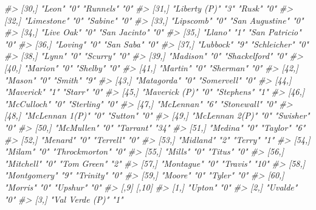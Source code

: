 \documentclass[
  12pt,
  openany]{book}
\newenvironment{Shaded}{\begin{snugshade}}{\end{snugshade}}
\newcommand{\CommentTok}[1]{\textcolor[rgb]{0.37,0.37,0.37}{\textit{#1}}}
\begin{document}
\begin{Shaded}
\begin{Highlighting}[]
\CommentTok{\#\textgreater{} [30,] "Leon"          "0"  "Runnels"       "0" }
\CommentTok{\#\textgreater{} [31,] "Liberty (P)"   "3"  "Rusk"          "0" }
\CommentTok{\#\textgreater{} [32,] "Limestone"     "0"  "Sabine"        "0" }
\CommentTok{\#\textgreater{} [33,] "Lipscomb"      "0"  "San Augustine" "0" }
\CommentTok{\#\textgreater{} [34,] "Live Oak"      "0"  "San Jacinto"   "0" }
\CommentTok{\#\textgreater{} [35,] "Llano"         "1"  "San Patricio"  "0" }
\CommentTok{\#\textgreater{} [36,] "Loving"        "0"  "San Saba"      "0" }
\CommentTok{\#\textgreater{} [37,] "Lubbock"       "9"  "Schleicher"    "0" }
\CommentTok{\#\textgreater{} [38,] "Lynn"          "0"  "Scurry"        "0" }
\CommentTok{\#\textgreater{} [39,] "Madison"       "0"  "Shackelford"   "0" }
\CommentTok{\#\textgreater{} [40,] "Marion"        "0"  "Shelby"        "0" }
\CommentTok{\#\textgreater{} [41,] "Martin"        "0"  "Sherman"       "0" }
\CommentTok{\#\textgreater{} [42,] "Mason"         "0"  "Smith"         "9" }
\CommentTok{\#\textgreater{} [43,] "Matagorda"     "0"  "Somervell"     "0" }
\CommentTok{\#\textgreater{} [44,] "Maverick"      "1"  "Starr"         "0" }
\CommentTok{\#\textgreater{} [45,] "Maverick (P)"  "0"  "Stephens"      "1" }
\CommentTok{\#\textgreater{} [46,] "McCulloch"     "0"  "Sterling"      "0" }
\CommentTok{\#\textgreater{} [47,] "McLennan"      "6"  "Stonewall"     "0" }
\CommentTok{\#\textgreater{} [48,] "McLennan 1(P)" "0"  "Sutton"        "0" }
\CommentTok{\#\textgreater{} [49,] "McLennan 2(P)" "0"  "Swisher"       "0" }
\CommentTok{\#\textgreater{} [50,] "McMullen"      "0"  "Tarrant"       "34"}
\CommentTok{\#\textgreater{} [51,] "Medina"        "0"  "Taylor"        "6" }
\CommentTok{\#\textgreater{} [52,] "Menard"        "0"  "Terrell"       "0" }
\CommentTok{\#\textgreater{} [53,] "Midland"       "2"  "Terry"         "1" }
\CommentTok{\#\textgreater{} [54,] "Milam"         "0"  "Throckmorton"  "0" }
\CommentTok{\#\textgreater{} [55,] "Mills"         "0"  "Titus"         "0" }
\CommentTok{\#\textgreater{} [56,] "Mitchell"      "0"  "Tom Green"     "2" }
\CommentTok{\#\textgreater{} [57,] "Montague"      "0"  "Travis"        "10"}
\CommentTok{\#\textgreater{} [58,] "Montgomery"    "9"  "Trinity"       "0" }
\CommentTok{\#\textgreater{} [59,] "Moore"         "0"  "Tyler"         "0" }
\CommentTok{\#\textgreater{} [60,] "Morris"        "0"  "Upshur"        "0" }
\CommentTok{\#\textgreater{}       [,9]            [,10]}
\CommentTok{\#\textgreater{}  [1,] "Upton"         "0"  }
\CommentTok{\#\textgreater{}  [2,] "Uvalde"        "0"  }
\CommentTok{\#\textgreater{}  [3,] "Val Verde (P)" "1"  }

\end{Highlighting}
\end{Shaded}
\end{document}
